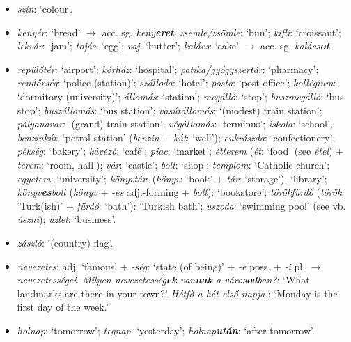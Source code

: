 \documentclass[a4paper,11pt]{article}
\begin{document}
\begin{itemize}
  \item \emph{szín}: `colour'.

  \item \emph{kenyér}: `bread' $\rightarrow$
    acc. sg. \emph{keny\textbf{eret}}; \emph{zsemle/zsömle}: `bun';
    \emph{kifli}: `croissant'; \emph{lekvár}: `jam'; \emph{tojás}:
    `egg'; \emph{vaj}: `butter'; \emph{kalács}: `cake' $\rightarrow$
    acc. sg. \emph{kalács\textbf{ot}}.

  \item \emph{repülőtér}: `airport'; \emph{kórház}: `hospital';
    \emph{patika/gyógyszertár}: `pharmacy'; \emph{rendőrség}: `police
    (station)'; \emph{szálloda}: `hotel'; \emph{posta}: `post office';
    \emph{kollégium}: `dormitory (university)'; \emph{állomás}:
    `station'; \emph{megálló}: `stop'; \emph{buszmegálló}: `bus stop';
    \emph{buszállomás}: `bus station'; \emph{vasútállomás}: `(modest)
    train station'; \emph{pályaudvar}: `(grand) train station';
    \emph{végállomás}: `terminus'; \emph{iskola}: `school';
    \emph{benzinkút}: `petrol station' (\emph{benzin} + \emph{kút}:
    `well'); \emph{cukrászda}: `confectionery'; \emph{pékség}:
    `bakery'; \emph{kávézó}: `café'; \emph{piac}: `market';
    \emph{étterem} (\emph{ét}: `food' (see \emph{étel}) +
    \emph{terem}: `room, hall'); \emph{vár}: `castle'; \emph{bolt}:
    `shop'; \emph{templom}: `Catholic church'; \emph{egyetem}:
    `university'; \emph{könyvtár}: (\emph{könyv}: `book' + \emph{tár}:
    `storage'): `library'; \emph{könyv\textbf{es}bolt} (\emph{könyv} +
    \emph{-es} adj.-forming + \emph{bolt}): `bookstore';
    \emph{törökfürdő} (\emph{török}: `Turk(ish)' + \emph{fürdő}:
    `bath'): `Turkish bath'; \emph{uszoda}: `swimming pool' (see
    vb. \emph{úszni}); \emph{üzlet}: `business'.

  \item \emph{zászló}: `(country) flag'.

  \item \emph{nevezetes}: adj. `famous' + \emph{-ség}: `state (of
    being)' + \emph{-e} poss. + \emph{-i} pl. $\rightarrow$
    \emph{nevezetességei}. \emph{Milyen nevezetesség\textbf{ek}
    van\textbf{nak} a város\textbf{od}ban?}: `What landmarks are there
    in your town?' \emph{Hétfő a hét első napja.}: `Monday is the
    first day of the week.'

  \item \emph{holnap}: `tomorrow'; \emph{tegnap}: `yesterday';
    \emph{holnap\textbf{után}}: `after tomorrow'.


\end{itemize}
\end{document}
